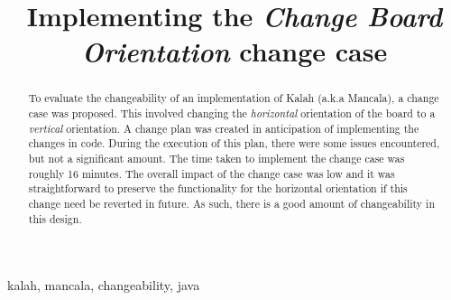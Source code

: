\documentclass[10pt, a4paper, conference]{IEEEtran}
\begin{document}
\title{Implementing the \textit{Change Board Orientation} change case}

\author{
}

\maketitle

\begin{abstract}
  To evaluate the changeability of an implementation of Kalah (a.k.a Mancala), a change case was
  proposed. This involved changing the \textit{horizontal} orientation of the board
  to a \textit{vertical} orientation. A change plan was created in anticipation
  of implementing the changes in code. During the execution of this plan, there
  were some issues encountered, but not a significant amount. The time taken to implement
  the change case was roughly 16 minutes. The overall impact of the change case was
  low and it was straightforward to preserve the functionality for the horizontal
  orientation if this change need be reverted in future. As such, there is a good
  amount of changeability in this design.
\end{abstract}

\begin{IEEEkeywords}
kalah, mancala, changeability, java
\end{IEEEkeywords}
\end{document}
